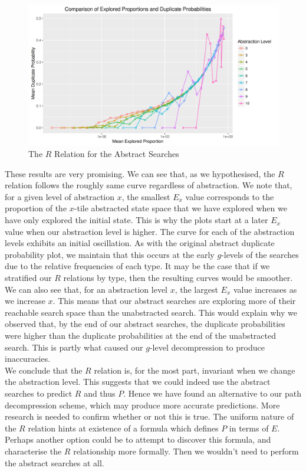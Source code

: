 \documentclass{article}
\begin{document}
\begin{figure}
  \centering
  \includegraphics[width=1\textwidth]{explored_vs_duplicates_plot}
  \caption{The \(R\) Relation for the Abstract Searches}
  \label{fig:epdp}
\end{figure}


These results are very promising. We can see that, as we hypothesised, the \(R\) relation follows
the roughly same curve regardless of abstraction.
We note that, for a given level of abstraction \(x\), the smallest \(E_x\) value corresponds
to the proportion of the \(x\)-tile abstracted state space that we have explored when we have only explored the initial state.
This is why the plots start at a later \(E_x\) value when our abstraction level is higher.
The curve for each of the abstraction levels exhibits an initial oscillation.
As with the original abstract duplicate probability plot, we maintain that this occurs at the early \(g\)-levels
of the searches due to the relative frequencies of each type.
It may be the case that if we stratified our \(R\) relations by type, then the resulting curves would be smoother.
We can also see that, for an abstraction level \(x\), the largest \(E_x\) value increases as we increase \(x\).
This means that our abstract searches are exploring more of their reachable search space
than the unabstracted search. This would explain why we observed that,
by the end of our abstract searches, the duplicate probabilities were higher than the duplicate probabilities
at the end of the unabstracted search. This is partly what caused our \(g\)-level decompression to produce inaccuracies. \\

We conclude that the \(R\) relation is, for the most part, invariant when we change the abstraction level.
This suggests that we could indeed use the abstract searches to predict \(R\) and thus \(P\).
Hence we have found an alternative to our path decompression scheme, which may produce
more accurate predictions. More research is needed to confirm whether or not this is true.
The uniform nature of the \(R\) relation hints at existence of a formula which defines \(P\) in terms of \(E\).
Perhaps another option could be to attempt to discover this formula, and characterise the \(R\) relationship
more formally. Then we wouldn't need to perform the abstract searches at all.
\end{document}
